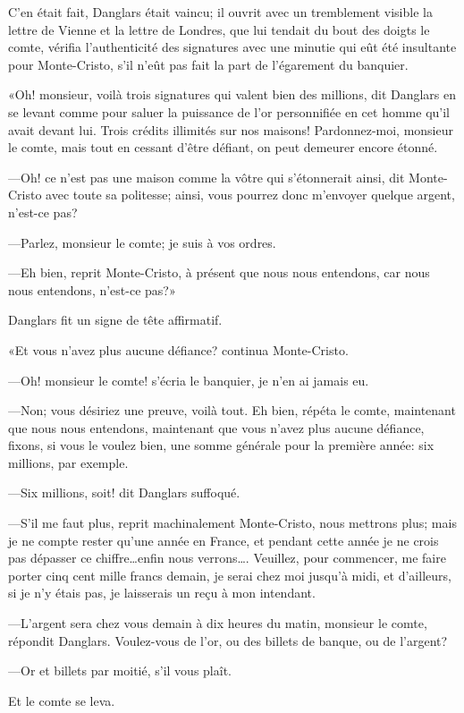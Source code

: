 C'en était fait, Danglars était vaincu; il ouvrit avec un tremblement visible la lettre de Vienne et la lettre de Londres, que lui tendait du bout des doigts le comte, vérifia l'authenticité des signatures avec une minutie qui eût été insultante pour Monte-Cristo, s'il n'eût pas fait la part de l'égarement du banquier. 

«Oh! monsieur, voilà trois signatures qui valent bien des millions, dit Danglars en se levant comme pour saluer la puissance de l'or personnifiée en cet homme qu'il avait devant lui. Trois crédits illimités sur nos maisons! Pardonnez-moi, monsieur le comte, mais tout en cessant d'être défiant, on peut demeurer encore étonné. 

—Oh! ce n'est pas une maison comme la vôtre qui s'étonnerait ainsi, dit Monte-Cristo avec toute sa politesse; ainsi, vous pourrez donc m'envoyer quelque argent, n'est-ce pas? 

—Parlez, monsieur le comte; je suis à vos ordres.  

—Eh bien, reprit Monte-Cristo, à présent que nous nous entendons, car nous nous entendons, n'est-ce pas?» 

Danglars fit un signe de tête affirmatif. 

«Et vous n'avez plus aucune défiance? continua Monte-Cristo. 

—Oh! monsieur le comte! s'écria le banquier, je n'en ai jamais eu. 

—Non; vous désiriez une preuve, voilà tout. Eh bien, répéta le comte, maintenant que nous nous entendons, maintenant que vous n'avez plus aucune défiance, fixons, si vous le voulez bien, une somme générale pour la première année: six millions, par exemple.  

—Six millions, soit! dit Danglars suffoqué. 

—S'il me faut plus, reprit machinalement Monte-Cristo, nous mettrons plus; mais je ne compte rester qu'une année en France, et pendant cette année je ne crois pas dépasser ce chiffre\dots enfin nous verrons\dots. Veuillez, pour commencer, me faire porter cinq cent mille francs demain, je serai chez moi jusqu'à midi, et d'ailleurs, si je n'y étais pas, je laisserais un reçu à mon intendant. 

—L'argent sera chez vous demain à dix heures du matin, monsieur le comte, répondit Danglars. Voulez-vous de l'or, ou des billets de banque, ou de l'argent?  

—Or et billets par moitié, s'il vous plaît. 

Et le comte se leva. 

